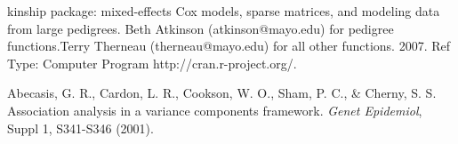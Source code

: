 \begin{References}\relax
kinship package: mixed-effects Cox models, sparse matrices, and modeling data from large pedigrees.
Beth Atkinson (atkinson@mayo.edu) for pedigree functions.Terry Therneau (therneau@mayo.edu) for all other functions.
2007. Ref Type: Computer Program http://cran.r-project.org/. 

Abecasis, G. R., Cardon, L. R., Cookson, W. O., Sham, P. C., \& Cherny, S. S. Association analysis in 
a variance components framework. \emph{Genet Epidemiol},  Suppl 1, S341-S346 (2001).
\end{References}

